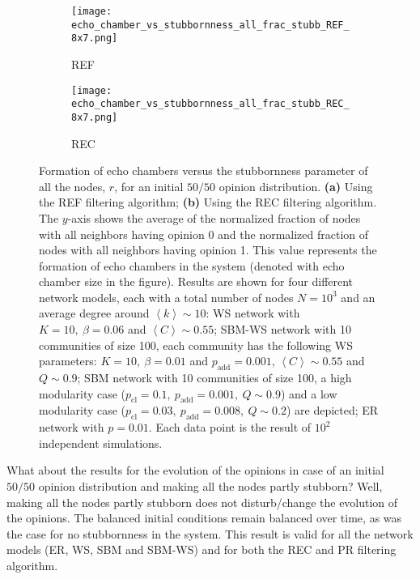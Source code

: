 \documentclass[11 pt , letterpaper , twoside , openright]{book}
\begin{document}
\begin{figure}[H]
  \begin{subfigure}[b]{0.49\textwidth}
  	\texttt{[image: echo\_chamber\_vs\_stubbornness\_all\_frac\_stubb\_REF\_8x7.png]}
    \caption{REF}
    \label{REF_all_frac_stubb}
  \end{subfigure}
  \begin{subfigure}[b]{0.49\textwidth}
  	\texttt{[image: echo\_chamber\_vs\_stubbornness\_all\_frac\_stubb\_REC\_8x7.png]}
    \caption{REC}
    \label{REC_all_frac_stubb}
  \end{subfigure}
  \captionsetup{format=plain}
  \caption[Formation of echo chambers versus the stubbornness parameter of all the nodes, $r$, for the REF and REC filtering algorithms and an initial $50/50$ opinion distribution.]{Formation of echo chambers versus the stubbornness parameter of all the nodes, $r$, for an initial $50/50$ opinion distribution. \textbf{(a)} Using the REF filtering algorithm; \textbf{(b)} Using the REC filtering algorithm. The $y$-axis shows the average of the normalized fraction of nodes with all neighbors having opinion 0 and the normalized fraction of nodes with all neighbors having opinion 1. This value represents the formation of echo chambers in the system (denoted with echo chamber size in the figure). Results are shown for four different network models, each with a total number of nodes $N=10^3$ and an average degree around $\left<k\right> \sim 10$: WS network with $K =10,\ \beta = 0.06$ and $\left<C\right> \sim 0.55$; SBM-WS network with 10 communities of size 100, each community has the following WS parameters: $K = 10,\ \beta = 0.01$ and $p_{\text{add}} = 0.001$, $\left<C\right> \sim 0.55$ and $Q \sim 0.9$; SBM network with 10 communities of size 100, a high modularity case ($p_{\text{cl}} = 0.1,\ p_{\text{add}} = 0.001,\ Q \sim 0.9$) and a low modularity case ($p_{\text{cl}} = 0.03,\ p_{\text{add}} = 0.008,\ Q \sim 0.2$) are depicted; ER network with $p= 0.01$. Each data point is the result of $10^2$ independent simulations.}
\label{echo_vs_all_frac_stubb_REF-REC}
\end{figure}
\noindent
What about the results for the evolution of the opinions in case of an initial $50/50$ opinion distribution and making all the nodes partly stubborn? Well, making all the nodes partly stubborn does not disturb/change the evolution of the opinions. The balanced initial conditions remain balanced over time, as was the case for no stubbornness in the system. This result is valid for all the network models (ER, WS, SBM and SBM-WS) and for both the REC and PR filtering algorithm.\\
\end{document}
